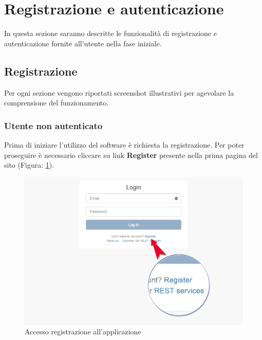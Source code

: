 %

\section{Registrazione e autenticazione} %
\label{sec:registrazione e autenticazione}
	In questa sezione saranno descritte le funzionalità di registrazione e autenticazione\gloss{} fornite all'utente nella fase iniziale.


	\subsection{Registrazione} %
	\label{sec:registrazione}
		Per ogni sezione vengono riportati screenshot\gloss{} illustrativi per agevolare la comprensione del funzionamento.


		\subsubsection{Utente non autenticato} %
		\label{sec:utente_non_autenticati}
			Prima di iniziare l'utilizzo del software \projectName{} è richiesta la registrazione.\newline
			Per poter proseguire è necessario cliccare su link \textbf{Register} presente nella prima pagina del sito (Figura: \ref{fig:registrazione_utente_accesso}).
			\begin{figure}[H]
				\centering
				\centerline{\includegraphics[width=14cm]{images/registrazione_utente_accesso.png}}
				\caption{Accesso registrazione all'applicazione}
				\label{fig:registrazione_utente_accesso}
			\end{figure}

